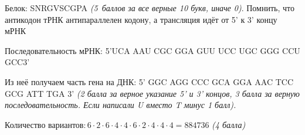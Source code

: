 Белок: SNRGVSCGPA \textit{(5~баллов за все верные 10 букв, иначе 0)}. Помнить, что антикодон тРНК антипараллелен кодону, а трансляция идёт от 5’ к 3’ концу мРНК

Последовательность мРНК: 5'UCA AAU CGC GGA GUU UCC UGC GGG CCU GCC3'

Из неё получаем часть гена на ДНК: 5' GGC AGG CCC GCA GGA AAC TCC GCG ATT TGA 3'\textit{ (2 балла за верное указание 5' и 3' концов, 3 балла за верную последовательность. Если написали U вместо T минус 1 балл).}

Количество вариантов$: 6\cdot2\cdot6\cdot4\cdot4\cdot6\cdot2\cdot4\cdot4\cdot4=884736$ \textit{(4 балла)}